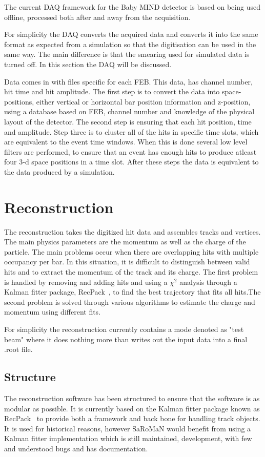 The current DAQ framework for the Baby MIND detector is based on being used offline, processed both after and away from the acquisition.

For simplicity the DAQ converts the acquired data and converts it into the same format as expected from a simulation so that the digitisation can be used in the same way. The main difference is that the smearing used for simulated data is turned off. In this section the DAQ will be discussed. 

Data comes in with files specific for each FEB. This data, has channel number, hit time and hit amplitude. The first step is to convert the data into space-positions, either vertical or horizontal bar position information and z-position, using a database based on FEB, channel number and knowledge of the physical layout of the detector. The second step is ensuring that each hit position, time and amplitude. Step three is to cluster all of the hits in specific time slots, which are equivalent to the event time windows. When this is done several low level filters are performed, to ensure that an event has enough hits to produce atleast four 3-d space positions in a time slot. After these steps the data is equivalent to the data produced by a simulation.

\section{Reconstruction}
The reconstruction takes the digitized hit data and assembles tracks and vertices. The main physics parameters are the momentum as well as the charge of the particle. The main problems occur when there are overlapping hits with multiple occupancy per bar. In this situation, it is difficult to distinguish between valid hits and to extract the momentum of the track and its charge.
The first problem is handled by removing and adding hits and using a $\chi^2$ analysis through a Kalman fitter package, RecPack~\cite{RecPack}, to find the best trajectory that fits all hits.The second problem is solved through various algorithms to estimate the charge and momentum using different fits.

For simplicity the reconstruction currently contains a mode denoted as "test beam" where it does nothing more than writes out the input data into a final .root file.

\subsection{Structure}
The reconstruction software has been structured to ensure that the software is as modular as possible. It is currently based on the Kalman fitter package known as RecPack~\cite{RecPack} to provide both a framework and back bone for handling track objects. It is used for historical reasons, however SaRoMaN would benefit from using a Kalman fitter implementation which is still maintained, development, with few and understood bugs and has documentation.

